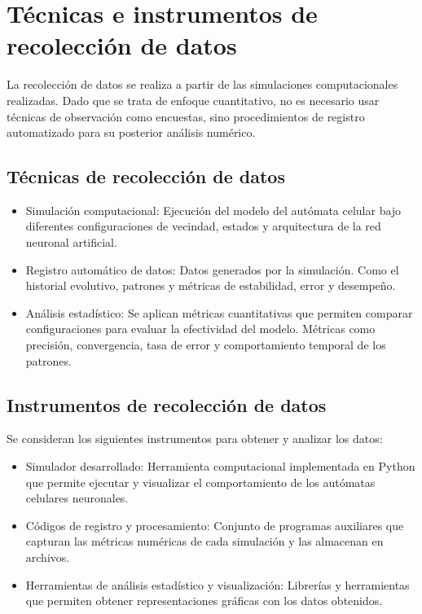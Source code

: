 \section{Técnicas e instrumentos de recolección de datos}

La recolección de datos se realiza a partir de las simulaciones computacionales realizadas. Dado que se trata de enfoque cuantitativo, no es necesario usar técnicas de observación como encuestas, sino procedimientos de registro automatizado para su posterior análisis numérico. 

\subsection{Técnicas de recolección de datos}

\begin{itemize}
	
	\item Simulación computacional: Ejecución del modelo del autómata celular bajo diferentes configuraciones de vecindad, estados y arquitectura de la red neuronal artificial.
	
	\item Registro automático de datos: Datos generados por la simulación. Como el historial evolutivo, patrones y métricas de estabilidad, error y desempeño.
	
	\item Análisis estadístico: Se aplican métricas cuantitativas que permiten comparar configuraciones para evaluar la efectividad del modelo. Métricas como precisión, convergencia, tasa de error y comportamiento temporal de los patrones.
	
\end{itemize}

\subsection{Instrumentos de recolección de datos}

Se consideran los siguientes instrumentos para obtener y analizar los datos:

\begin{itemize}
	
	\item Simulador desarrollado: Herramienta computacional implementada en Python que permite ejecutar y visualizar el comportamiento de los autómatas celulares neuronales.
	
	\item Códigos de registro y procesamiento: Conjunto de programas auxiliares que capturan las métricas numéricas de cada simulación y las almacenan en archivos.
	
	\item Herramientas de análisis estadístico y visualización: Librerías y herramientas que permiten obtener representaciones gráficas con los datos obtenidos. 
	
\end{itemize}